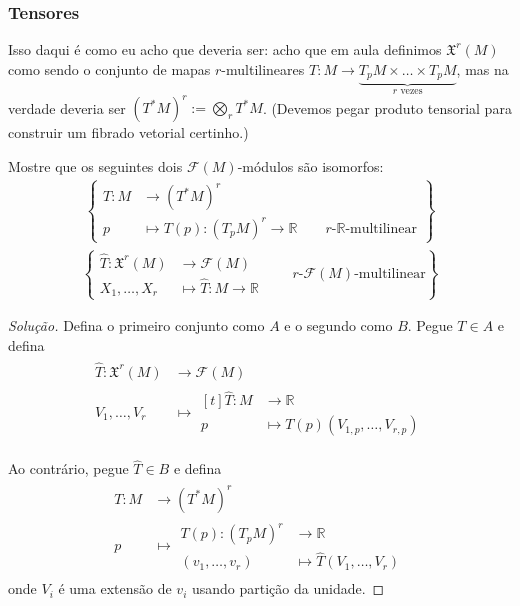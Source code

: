 \subsubsection{Tensores}

{\color{6}Isso daqui é como eu acho que deveria ser:} acho que em aula definimos \(\mathfrak{X}^r(M)\) como sendo o conjunto de mapas \(r\)-multilineares \(T:M \to \underbrace{T_pM\times\ldots\times T_pM}_{r\text{ vezes} }\), mas na verdade deveria ser \((T^*M)^r:= \bigotimes_r T^*M\). (Devemos pegar produto tensorial para construir um fibrado vetorial certinho.)

\begin{exercise}\leavevmode
Mostre que os seguintes dois \(\mathcal{F}(M)\)-módulos são isomorfos:
\begin{align*}
	\left\{\begin{aligned}T: M &\longrightarrow (T^*M)^r \\
	p &\longmapsto T(p): (T_pM)^r \longrightarrow \mathbb{R}\qquad \text{\(r\)-\(\mathbb{R}\)-multilinear}
\end{aligned}\right\}
\end{align*}
\begin{align*}
\left\{ \begin{aligned}
\hat{T}:\mathfrak{X}^r(M) &\longrightarrow\mathcal{F}(M)\\
X_1,\ldots,X_r &  \longmapsto \hat{T}: M \longrightarrow \mathbb{R}
\end{aligned}\qquad \text{\(r\)-\(\mathcal{F}(M)\)-multilinear} \right\} 
\end{align*}
\end{exercise}

\begin{proof}[Solução]\leavevmode
	Defina o primeiro conjunto como \(A\) e o segundo como \(B\). Pegue \(T \in A\) e defina
\begin{align*}
	\begin{aligned}
		\hat{T}:\mathfrak{X}^r(M) &\longrightarrow\mathcal{F}(M)\\
		V_1,\ldots,V_r &  \longmapsto 
		\begin{aligned}[t]
			\hat{T}: M &\longrightarrow \mathbb{R} \\
			p &\longmapsto T(p)(V_{1,p},\ldots,V_{r,p})
		\end{aligned}
	\end{aligned}
\end{align*}

Ao contrário, pegue \(\hat{T} \in B\) e defina
\begin{align*}
\begin{aligned}
	T: M &\longrightarrow  (T^*M)^r\\
	 p&\longmapsto \begin{aligned}
	 	T(p): (T_pM)^r &\longrightarrow \mathbb{R} \\
		(v_1,\ldots,v_r) &\longmapsto \hat{T}(V_1,\ldots,V_r)
	 \end{aligned}
\end{aligned}
\end{align*}
onde \(V_i\) é uma extensão de \(v_i\) usando partição da unidade.
\end{proof}

